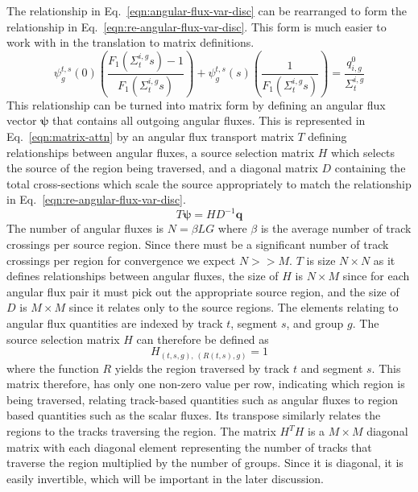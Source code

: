 The relationship in Eq.~\ref{eqn:angular-flux-var-disc} can be rearranged to form the relationship in Eq.~\ref{eqn:re-angular-flux-var-disc}. This form is much easier to work with in the translation to matrix definitions.
\begin{equation}
 \psi^{t,s}_g(0) \left(\frac{F_1\left(\Sigma_{t}^{i,g} s \right) - 1}{F_1\left(\Sigma_{t}^{i,g} s \right)}\right) + \psi_g^{t,s}(s) \left(\frac{1}{F_1\left(\Sigma_{t}^{i,g} s \right)}\right) = \frac{q^0_{i,g}}{\Sigma_{t}^{i,g}}
\label{eqn:re-angular-flux-var-disc}
\end{equation}
This relationship can be turned into matrix form by defining an angular flux vector $\boldsymbol{\psi}$ that contains all outgoing angular fluxes. This is represented in Eq.~\ref{eqn:matrix-attn} by an angular flux transport matrix $T$ defining relationships between angular fluxes, a source selection matrix $H$ which selects the source of the region being traversed, and a diagonal matrix $D$ containing the total cross-sections which scale the source appropriately to match the relationship in Eq.~\ref{eqn:re-angular-flux-var-disc}.
\begin{equation}
T \boldsymbol{\psi} = H D^{-1} \mathbf{q}
\label{eqn:matrix-attn}
\end{equation}
The number of angular fluxes is $N = \beta L G$ where $\beta$ is the average number of track crossings per source region. Since there must be a significant number of track crossings per region for convergence we expect $N >> M$. $T$ is size $N \times N$ as it defines relationships between angular fluxes, the size of $H$ is $N \times M$ since for each angular flux pair it must pick out the appropriate source region, and the size of $D$ is $M \times M$ since it relates only to the source regions. The elements relating to angular flux quantities are indexed by track $t$, segment $s$, and group $g$. The source selection matrix $H$ can therefore be defined as
\begin{equation}
H_{\left(t,s,g\right), \, \left(R(t,s), g\right)} = 1
\label{eqn:source-selection-matrix}
\end{equation}
where the function $R$ yields the region traversed by track $t$ and segment $s$. This matrix therefore, has only one non-zero value per row, indicating which region is being traversed, relating track-based quantities such as angular fluxes to region based quantities such as the scalar fluxes. Its transpose similarly relates the regions to the tracks traversing the region. The matrix $H^T H$ is a $M \times M$ diagonal matrix with each diagonal element representing the number of tracks that traverse the region multiplied by the number of groups. Since it is diagonal, it is easily invertible, which will be important in the later discussion.
